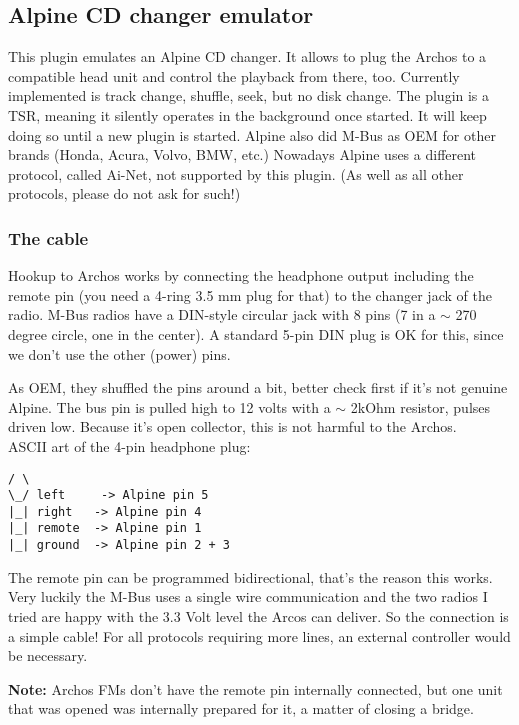 \subsection{Alpine CD changer emulator}
This plugin emulates an Alpine CD changer. It allows to plug the Archos to a
compatible head unit and control the playback from there, too. Currently
implemented is track change, shuffle, seek, but no disk change. The plugin is a
TSR, meaning it silently operates in the background once started. It will keep
doing so until a new plugin is started.
Alpine also did M-Bus as OEM for other brands (Honda, Acura, Volvo, BMW, etc.)
Nowadays Alpine uses a different protocol, called Ai-Net, not supported by this
plugin. (As well as all other protocols, please do not ask for such!)

\subsubsection{The cable}
Hookup to Archos works by connecting the headphone output including the remote
pin (you need a 4-ring 3.5 mm plug for that) to the changer jack of the radio.
M-Bus radios have a DIN-style circular jack with 8 pins (7 in a $\sim$ 270 degree
circle, one in the center). A standard 5-pin DIN plug is OK for this, since we
don't use the other (power) pins.

As OEM, they shuffled the pins around a bit, better check first if it's not
genuine Alpine. The bus pin is pulled high to 12 volts with a $\sim$ 2kOhm resistor,
pulses driven low. Because it's open collector, this is not harmful to the
Archos.\\
ASCII art of the 4-pin headphone plug:
\begin{verbatim}
/ \
\_/ left     -> Alpine pin 5
|_| right   -> Alpine pin 4
|_| remote  -> Alpine pin 1
|_| ground  -> Alpine pin 2 + 3
\end{verbatim}

The remote pin can be programmed bidirectional, that's the reason this works.
Very luckily the M-Bus uses a single wire communication and the two radios I
tried are happy with the 3.3 Volt level the Arcos can deliver. So the
connection is a simple cable! For all protocols requiring more lines, an
external controller would be necessary.

\textbf{Note:} Archos FMs don't have the remote pin internally connected, but
one unit that was opened was internally prepared for it, a matter of closing a
bridge. 
